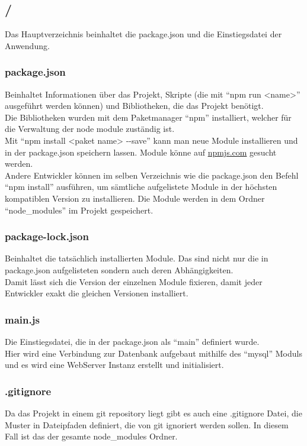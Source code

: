 \documentclass[12pt,pdftex,parskip=half]{scrartcl}
\begin{document}
    \subsection{/}
    Das Hauptverzeichnis beinhaltet die package.json und die Einstiegsdatei der Anwendung.

    \subsubsection{package.json}
    Beinhaltet Informationen über das Projekt, Skripte (die mit ``npm run <name>'' ausgeführt werden können) und Bibliotheken, die das Projekt benötigt.\\
    Die Bibliotheken wurden mit dem Paketmanager "`npm"' installiert, welcher für die Verwaltung der node module zuständig ist.\\
    Mit ``npm install <paket name> -{}-save'' kann man neue Module installieren und in der package.json speichern lassen. Module könne auf \href{https://www.npmjs.com/}{npmjs.com} gesucht werden.\\
    Andere Entwickler können im selben Verzeichnis wie die package.json den Befehl ``npm install'' ausführen, um sämtliche aufgelistete Module in der höchsten kompatiblen Version zu installieren.
    Die Module werden in dem Ordner ``node\_modules'' im Projekt gespeichert.

    \subsubsection{package-lock.json}
    Beinhaltet die tatsächlich installierten Module. Das sind nicht nur die in package.json aufgelisteten sondern auch deren Abhängigkeiten.\\
    Damit lässt sich die Version der einzelnen Module fixieren, damit jeder Entwickler exakt die gleichen Versionen installiert.


    \subsubsection{main.js}
    Die Einstiegsdatei, die in der package.json als ``main'' definiert wurde.\\
    Hier wird eine Verbindung zur Datenbank aufgebaut mithilfe des "`mysql"' Moduls und es wird eine WebServer Instanz erstellt und initialisiert.

    \subsubsection{.gitignore}
    Da das Projekt in einem git repository liegt gibt es auch eine .gitignore Datei, die Muster in Dateipfaden definiert, die von git ignoriert werden sollen. In diesem Fall ist das der gesamte node\_modules Ordner.
\end{document}
